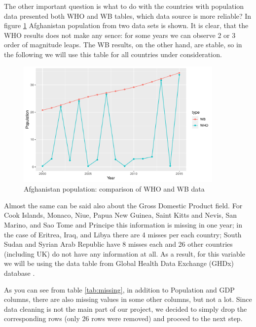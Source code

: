 The other important question is what to do with the countries with population data presented both WHO and WB tables, which data source is more reliable? In figure \ref{fig:afghanistan_pop_comparison} Afghanistan population from two data sets is shown. It is clear, that the WHO results does not make any sence: for some years we can observe 2 or 3 order of magnitude leaps. The WB results, on the other hand, are stable, so in the following we will use this table for all countries under consideration.


\begin{figure}
  \centering
  \includegraphics[width = 0.9\textwidth]{figures/Afghanistan_population_comparison}
  \caption{Afghanistan population: comparison of WHO and WB data}
  \label{fig:afghanistan_pop_comparison}
\end{figure}

Almost the same can be said also about the Gross Domestic Product field. For Cook Islands, Monaco, Niue, Papua New Guinea, Saint Kitts and Nevis, San Marino, and Sao Tome and Principe this information is missing in one year; in the case of Eritrea, Iraq, and Libya there are 4 misses per each country; South Sudan and Syrian Arab Republic have 8 misses each and 26 other countries (including UK) do not have any information at all. As a result, for this variable we will be using the data table from Global Health Data Exchange (GHDx) database \cite{GHDx}.

As you can see from table \ref{tab:missing}, in addition to Population and GDP columns, there are also missing values in some other columns, but not a lot. Since data cleaning is not the main part of our project, we decided to simply drop the corresponding rows (only 26 rows were removed) and proceed to the next step.








